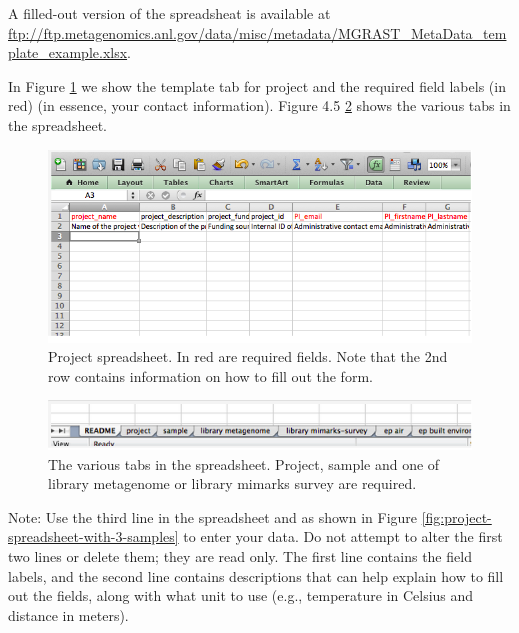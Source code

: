 \documentclass[12pt,fullpage]{report}
\begin{document}
A filled-out version of the spreadsheat is available at \url{ftp://ftp.metagenomics.anl.gov/data/misc/metadata/MGRAST_MetaData_template_example.xlsx}.

In Figure \ref{fig:project-spreadsheet} we show the template tab for project and the required field labels (in red) (in essence, your contact information).
Figure 4.5
\ref{fig:project-spreadsheet-multiple-tabs}
shows the various tabs in the spreadsheet.

\begin{figure}[ht]
\begin{center}
\includegraphics[width=6in]{Images/project-spreadsheet.png}
\end{center}
\caption{
Project spreadsheet. In red are required fields. Note that the 2nd row contains information on how to fill out the form.
}
\label{fig:project-spreadsheet}
\end{figure}



\begin{figure}[ht]
\begin{center}
\includegraphics[width=6in]{Images/project-spreadsheet-multiple-tabs.png}
\end{center}
\caption{
The various tabs in the spreadsheet. Project, sample and one of library metagenome or library mimarks survey are required.
}
\label{fig:project-spreadsheet-multiple-tabs}
\end{figure}

Note: Use the third line in the spreadsheet and as shown in Figure \ref{fig:project-spreadsheet-with-3-samples} to enter your data. Do not attempt to alter the first two lines or delete them; they are read only. The first line contains the field labels, and the second line contains descriptions that can help explain how to fill out the fields, along with what unit to use (e.g., temperature in Celsius and distance in meters).
\end{document}
